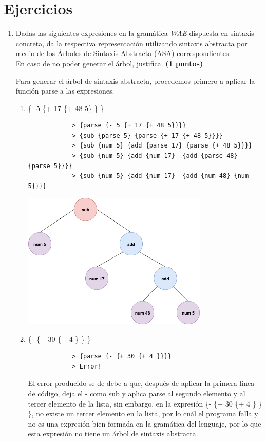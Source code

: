 \documentclass[11pt]{article}
\begin{document}
\section*{Ejercicios}

\begin{enumerate}[leftmargin=0.8cm]

    \item Dadas las siguientes expresiones en la gramática \textit{WAE} dispuesta en sintaxis concreta, da la respectiva representación utilizando sintaxis abstracta por medio de los Árboles de Sintaxis Abstracta (ASA) correspondientes.\\
    En caso de no poder generar el árbol, justifica. \textbf{(1 puntos)}

    Para generar el árbol de sintaxis abstracta, procedemos primero a aplicar la función parse a las expresiones.
    \begin{enumerate}
        \item \{- 5 \{+ 17 \{+ 48 5\} \} \}\\
        \begin{lstlisting}
            > {parse {- 5 {+ 17 {+ 48 5}}}}
            > {sub {parse 5} {parse {+ 17 {+ 48 5}}}}
            > {sub {num 5} {add {parse 17} {parse {+ 48 5}}}}
            > {sub {num 5} {add {num 17}  {add {parse 48} {parse 5}}}}
            > {sub {num 5} {add {num 17}  {add {num 48} {num 5}}}}
        \end{lstlisting}
        \begin{center}
            \includegraphics[height=6.5cm]{ASA.png}
        \end{center}

        \item \{- \{+ 30 \{+ 4 \} \} \}
        \begin{lstlisting}
            > {parse {- {+ 30 {+ 4 }}}}
            > Error!
        \end{lstlisting}
        El error producido se de debe a que, después de aplicar la primera línea de código, deja el - como sub y aplica parse al segundo elemento y al tercer elemento de la lista, sin embargo, en la expresión \{- \{+ 30 \{+ 4 \} \} \}, no existe un tercer elemento en la lista, por lo cuál el programa falla y no es una expresión bien formada en la gramática del lenguaje, por lo que esta expresión no tiene un árbol de sintaxis abstracta.
    \end{enumerate}


\end{enumerate}
\end{document}
